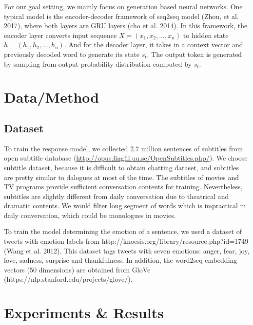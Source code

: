 \documentclass{article}
\begin{document}
For our goal setting, we mainly focus on generation based neural networks. One typical model is the encoder-decoder framework of seq2seq model (Zhou, et al. 2017), where both layers are GRU layers (cho et al. 2014). In this framework, the encoder layer converts input sequence $X = (x_1, x_2, ..., x_n)$ to hidden state $h = (h_1, h_2, ..., h_n)$. And for the decoder layer, it takes in a context vector and previously decoded word to generate its state $s_t$. The output token is generated by sampling from output probability distribution computed by $s_t$.




\section{Data/Method}

\subsection{Dataset}

To train the response model, we collected 2.7 million sentences of subtitles from open subtitle database (\url{http://opus.lingfil.uu.se/OpenSubtitles.php/}). We choose subtitle dataset, because it is difficult to obtain chatting dataset, and subtitles are pretty similar to dalogues at most of the time. The subtitles of movies and TV programs provide sufficient conversation contents for training. Nevertheless, subtitles are slightly different from daily conversation due to theatrical and dramatic contents. We would filter long segment of words which is impractical in daily conversation, which could be monologues in movies. \par

To train the model determining the emotion of a sentence, we used a dataset of tweets with emotion labels from http://knoesis.org/library/resource.php?id=1749 (Wang et al. 2012). This dataset tags tweets with seven emotions: anger, fear, joy, love, sadness, surprise and thankfulness. In addition, the word2seq embedding vectors (50 dimensions) are obtained from GloVe (https://nlp.stanford.edu/projects/glove/). 















\section{Experiments \& Results}
\end{document}

